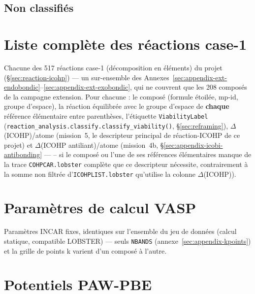 \documentclass[11pt,a4paper]{article}
\begin{document}
{\small

}

\subsection{Non classifiés}

{\small

}

\section{Liste complète des réactions case-1}
\label{sec:appendix-full-reactions}

Chacune des 517 réactions case-1 (décomposition en éléments) du projet
(\S\ref{sec:reaction-icohp}) --- un sur-ensemble des
Annexes~\ref{sec:appendix-ext-endobondic}--\ref{sec:appendix-ext-exobondic},
qui ne couvrent que les 208 composés de la campagne \og{}extension\fg{}.
Pour chacune : le composé (formule étoilée, mp-id, groupe d'espace), la
réaction équilibrée avec le groupe d'espace de \textbf{chaque} référence
élémentaire entre parenthèses, l'étiquette \texttt{ViabilityLabel}
(\texttt{reaction\_analysis.classify.classify\_viability()},
\S\ref{sec:reframing}), $\Delta$(ICOHP)/atome (mission~5, le descripteur
principal de réaction-ICOHP de ce projet) et $\Delta$(ICOHP
antiliant)/atome (mission~4b, \S\ref{sec:appendix-icobi-antibonding} ---
\og{}--\fg{} si le composé ou l'une de ses références élémentaires
manque de la trace \texttt{COHPCAR.lobster} complète que ce descripteur
nécessite, contrairement à la somme non filtrée d'\texttt{ICOHPLIST.lobster}
qu'utilise la colonne $\Delta$(ICOHP)).

{\scriptsize

}

\section{Paramètres de calcul VASP}
\label{sec:appendix-incar}

Paramètres INCAR fixes, identiques sur l'ensemble du jeu de données
(calcul statique, compatible LOBSTER) --- seuls \texttt{NBANDS}
(annexe~\ref{sec:appendix-kpoints}) et la grille de points k varient d'un
composé à l'autre.

\begin{center}

\end{center}

\section{Potentiels PAW-PBE}
\end{document}
